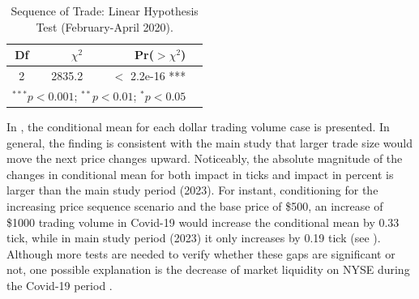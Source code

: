 \begin{table}[H]
    \centering
    \vspace{0.5em}
    \begin{tabular}{crrl}
        \toprule
        Df & $\chi^2$ & Pr($>$$\chi^2$) \\
        \midrule
         2 & 2835.2 & $<$ 2.2e-16 *** \\ 
         \bottomrule
        \multicolumn{3}{l}{$^{***}p < 0.001$; $^{**}p < 0.01$; $^{*}p < 0.05$}
    \end{tabular}
        \caption{Sequence of Trade: Linear Hypothesis Test (February-April 2020).}
    \label{tab:table-18}
\end{table}

In , the conditional mean for each dollar trading volume case is presented. In general, the finding is consistent with the main study that larger trade size would move the next price changes upward. Noticeably, the absolute magnitude of the changes in conditional mean for both impact in ticks and impact in percent is larger than the main study period (2023). For instant, conditioning for the increasing price sequence scenario and the base price of \$500, an increase of \$1000 trading volume in Covid-19 would increase the conditional mean by 0.33 tick, while in main study period (2023) it only increases by 0.19 tick (see ). Although more tests are needed to verify whether these gaps are significant or not, one possible explanation is the decrease of market liquidity on NYSE during the Covid-19 period \citep{chung&chuwonganant2023}. 






